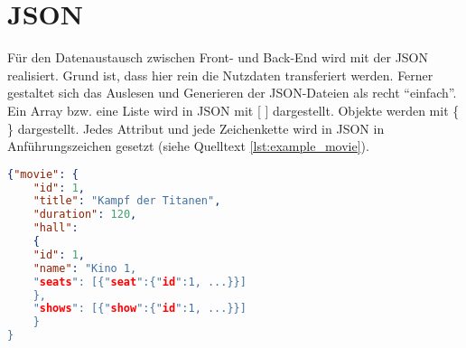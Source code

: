 \section{\acf{JSON}}
\label{sec:json}
Für den Datenaustausch zwischen Front- und Back-End wird mit der \acf{JSON} realisiert.
Grund ist, dass hier rein die Nutzdaten transferiert werden.
Ferner gestaltet sich das Auslesen und Generieren der \acs{JSON}-Dateien als recht \enquote{einfach}. \\
Ein Array bzw. eine Liste wird in \acs{JSON} mit [ ] dargestellt.
Objekte werden mit \{ \} dargestellt.
Jedes Attribut und jede Zeichenkette wird in \acs{JSON} in Anführungszeichen gesetzt (siehe Quelltext \vref{lst:example_movie}).

\begin{lstlisting}[language=json,firstnumber=1]
{"movie": {
	"id": 1,
	"title": "Kampf der Titanen",
	"duration": 120,
	"hall":
	{
	"id": 1,
	"name": "Kino 1,
	"seats": [{"seat":{"id":1, ...}}]
	}, 
	"shows": [{"show":{"id":1, ...}}]
	}
}
\end{lstlisting}
\label{lst:example_movie}